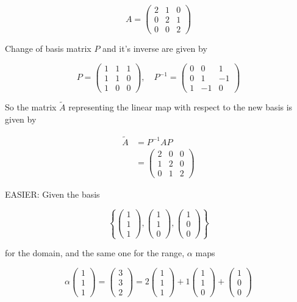 \documentclass[a4paper]{article}
\begin{document}
\[ A =  \begin{pmatrix}
2 & 1 & 0\\
0 & 2 & 1\\
0 & 0 & 2
\end{pmatrix} \]

Change of basis matrix $ P $ and it's inverse are given by

\[ P = \begin{pmatrix}
1 & 1 & 1 \\
1 & 1 & 0\\
1 & 0 & 0
\end{pmatrix}, \quad P^{-1} = \begin{pmatrix}
0 & 0 & 1 \\
0 & 1 & -1 \\
1 & -1 & 0
\end{pmatrix} \]

So the matrix $ \tilde{A} $ representing the linear map with respect to the new basis is given by

\begin{align*}
\tilde{A}  & =  P^{-1} A P \\
& = \begin{pmatrix}
2 & 0 & 0\\
1 & 2 & 0 \\
0 & 1 & 2
\end{pmatrix}
\end{align*}

EASIER:
Given the basis 

\[ \left\{  \begin{pmatrix}
1\\
1\\
1
\end{pmatrix},
\begin{pmatrix}
1\\
1\\
0
\end{pmatrix},
\begin{pmatrix}
1\\
0\\
0
\end{pmatrix} \right\}    \]

for the domain, and the same one for the range, $ \alpha $ maps

\[ \alpha \begin{pmatrix}
1\\
1\\
1
\end{pmatrix} = \begin{pmatrix}
3\\
3\\
2
\end{pmatrix} = 2 \begin{pmatrix}
1\\
1\\
1
\end{pmatrix} 
+ 1 \begin{pmatrix}
1\\
1\\
0
\end{pmatrix}
+ 
\begin{pmatrix}
1\\
0\\
0
\end{pmatrix} \]
\end{document}
